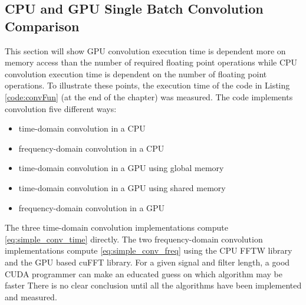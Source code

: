 \subsection{CPU and GPU Single Batch Convolution Comparison}
\label{sec:cuda_convolution_single}
This section will show GPU convolution execution time is dependent more on memory access than the number of required floating point operations while CPU convolution execution time is dependent on the number of floating point operations.
To illustrate these points, the execution time of the code in Listing \ref{code:convFun} (at the end of the chapter) was measured.
The code implements convolution five different ways:
\begin{itemize}
  \item time-domain convolution in a CPU
  \item frequency-domain convolution in a CPU
  \item time-domain convolution in a GPU using global memory
  \item time-domain convolution in a GPU using shared memory
  \item frequency-domain convolution in a GPU
\end{itemize}

The three time-domain convolution implementations compute \eqref{eq:simple_conv_time} directly.
The two \newline frequency-domain convolution implementations compute \eqref{eq:simple_conv_freq} using the CPU FFTW library and the GPU based cuFFT library.
For a given signal and filter length, a good CUDA programmer can make an educated guess on which algorithm may be faster
There is no clear conclusion until all the algorithms have been implemented and measured.

